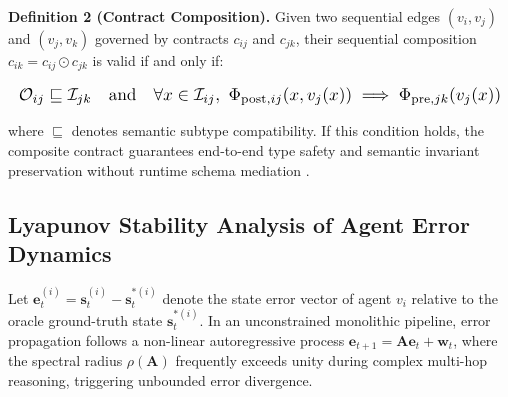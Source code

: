 \documentclass[10pt,twocolumn,letterpaper]{article}
\begin{document}
\textbf{Definition 2 (Contract Composition).} Given two sequential edges $(v_i, v_j)$ and $(v_j, v_k)$ governed by contracts $c_{ij}$ and $c_{jk}$, their sequential composition $c_{ik} = c_{ij} \odot c_{jk}$ is valid if and only if:





















\begin{equation}
\resizebox{\columnwidth}{!}{$\displaystyle
\begin{aligned}
\mathcal{O}_{ij} \sqsubseteq \mathcal{I}_{jk} \quad \text{and} \quad \forall x \in \mathcal{I}_{ij},\ \Phi_{\text{post}, ij}(x, v_j(x)) \implies \Phi_{\text{pre}, jk}(v_j(x))
\end{aligned}
$}
\end{equation}





















where $\sqsubseteq$ denotes semantic subtype compatibility. If this condition holds, the composite contract guarantees end-to-end type safety and semantic invariant preservation without runtime schema mediation \cite{crossref_10_18653_v1_2026_findings_acl_1933}.


\subsection{Lyapunov Stability Analysis of Agent Error Dynamics}


Let $\mathbf{e}_t^{(i)} = \mathbf{s}_t^{(i)} - \mathbf{s}_t^{*(i)}$ denote the state error vector of agent $v_i$ relative to the oracle ground-truth state $\mathbf{s}_t^{*(i)}$. In an unconstrained monolithic pipeline, error propagation follows a non-linear autoregressive process $\mathbf{e}_{t+1} = \mathbf{A}\mathbf{e}_t + \mathbf{w}_t$, where the spectral radius $\rho(\mathbf{A})$ frequently exceeds unity during complex multi-hop reasoning, triggering unbounded error divergence.
\end{document}
